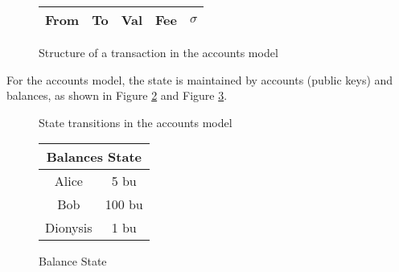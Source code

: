 \begin{figure}[h]
\centering
    \begin{tabular}{|c|c|c|c|c|}
         \hline
         From & To & Val & Fee & {$\sigma$} \\
         \hline
    \end{tabular}
    \label{fig:accountsTx}
    \caption{Structure of a transaction in the accounts model}
\end{figure}

For the accounts model, the state is maintained by accounts (public keys) and balances, as shown in Figure \ref{fig:AccountsModelDiagram} and Figure \ref{fig:balanceState}.

\begin{figure}[h]
    \centering
    \caption{State transitions in the accounts model}
    \label{fig:AccountsModelDiagram}
\end{figure}

\begin{figure}[ht]
    \centering
        \begin{tabular}{c|c}
        \multicolumn{2}{c}{Balances State} \\
        \hline
        Alice   & 5 bu  \\
        \hline
        Bob     & 100 bu \\
        \hline
        Dionysis & 1 bu \\
        \hline
        \end{tabular}
    \caption{Balance State}
    \label{fig:balanceState}
\end{figure}

